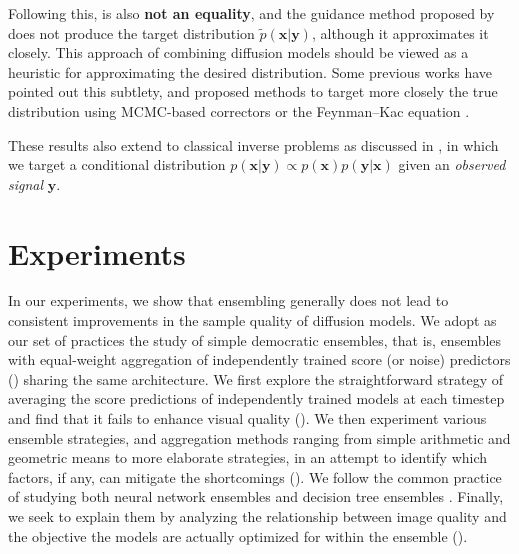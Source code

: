 \documentclass[10pt]{article} %
\def\rvx{{\mathbf{x}}}
\def\rvy{{\mathbf{y}}}
\begin{document}
Following this,  is also \textbf{not an equality}, and the guidance method proposed by \citet{ho2022classifier} does not produce the target distribution $\widetilde{p}(\rvx|\rvy)$, although it approximates it closely. This approach of combining diffusion models should be viewed as a heuristic for approximating the desired distribution. Some previous works have pointed out this subtlety, and proposed methods to target more closely the true distribution using MCMC-based correctors \citep{du2023reducereuserecyclecompositional} or the Feynman–Kac equation \citep{skreta2025feynman}.


These results also extend to classical inverse problems as discussed in , in which we target a conditional distribution $p(\rvx | \rvy) \propto p(\rvx)p(\rvy | \rvx)$ given an \textit{observed signal} $\rvy$.

\section{Experiments}\label{section: experiments}
In our experiments, we show that ensembling generally does not lead to consistent improvements in the sample quality of diffusion models. We adopt as our set of practices the study of simple democratic ensembles, that is, ensembles with equal-weight aggregation of independently trained score (or noise) predictors () sharing the same architecture. We first explore the straightforward strategy of averaging the score predictions of independently trained models at each timestep and find that it fails to enhance visual quality (). We then experiment various ensemble strategies, and aggregation methods ranging from simple arithmetic and geometric means to more elaborate strategies, in an attempt to identify which factors, if any, can mitigate the shortcomings (). We follow the common practice of studying both neural network ensembles and decision tree ensembles \citep{wood2023unified,theisen2023ensembles}. Finally, we seek to explain them by analyzing the relationship between image quality and the objective the models are actually optimized for within the ensemble ().
\end{document}
